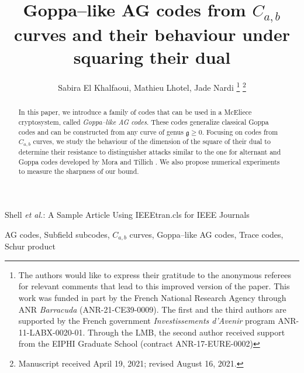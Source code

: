 \documentclass[journal]{IEEEtran}
\theoremstyle{plain}
\theoremstyle{definition}
\theoremstyle{remark}
\begin{document}
	
	\title{Goppa--like AG codes from $C_{a,b}$ curves and their behaviour under squaring their dual}
	

	\author{Sabira El Khalfaoui, Mathieu Lhotel, Jade Nardi
		\thanks{The authors would like to express their gratitude to the anonymous referees for relevant comments that lead to this improved version of the paper.
			This work was funded in part by the French National Research Agency through ANR \textit{Barracuda} (ANR-21-CE39-0009). The first and the third authors are supported by the French government \textit{Investissements d’Avenir} program ANR-11-LABX-0020-01. Through the LMB, the second author received support from the  EIPHI Graduate School (contract ANR-17-EURE-0002)}%
		\thanks{Manuscript received April 19, 2021; revised August 16, 2021.}}
	
	{Shell \MakeLowercase{\textit{et al.}}: A Sample Article Using IEEEtran.cls for IEEE Journals}
	
	
	
	
	\maketitle
	
	\begin{abstract}
		In this paper, we introduce a family of codes that can be used in a McEliece cryptosystem, called \emph{Goppa--like AG codes}. These codes generalize classical Goppa codes and can be constructed from any curve of genus $\mathfrak{g} \geq 0$. Focusing on codes from $C_{a,b}$ curves, we study the behaviour of the dimension of the square of their dual to determine their resistance to distinguisher attacks similar to the one for alternant and Goppa codes developed by Mora and Tillich \cite{MT21}. We also propose numerical experiments to measure the sharpness of our bound.
	\end{abstract}
	
	\begin{IEEEkeywords}
		AG codes, Subfield subcodes, $C_{a,b}$ curves, Goppa--like AG codes, Trace codes, Schur product
	\end{IEEEkeywords}
	
\end{document}
